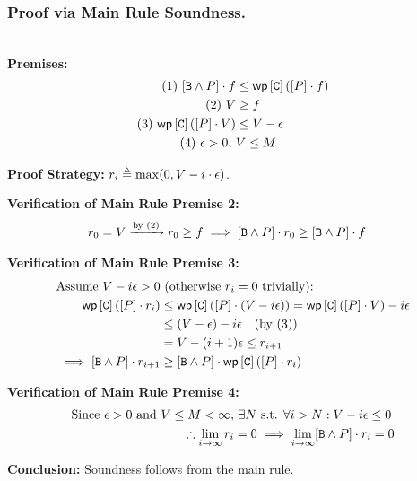 \subsubsection{Proof via Main Rule Soundness.}~\\
\noindent\textbf{Premises:}
\begin{align*}
  \text{(1) } [\mathtt{B} \wedge P] \cdot f &\le \mathsf{wp}\left[{\mathtt{C}}\right]\left({[P] \cdot f}\right) \\
  \text{(2) } V &\geq f \\
  \text{(3) } \mathsf{wp}\left[{\mathtt{C}}\right]\left({[P] \cdot V}\right) &\le V - \epsilon \\
  \text{(4) } \epsilon > 0, \ &V \leq M
\end{align*}

\noindent\textbf{Proof Strategy:} $r_i \triangleq \max(0, V - i \cdot \epsilon)$.

\noindent\textbf{Verification of Main Rule Premise 2:}
\begin{align*}
  r_0 = V \xrightarrow{\text{by (2)}} r_0 \ge f
    &\implies [\mathtt{B} \wedge P] \cdot r_0 \ge [\mathtt{B} \wedge P] \cdot f
\end{align*}

\noindent\textbf{Verification of Main Rule Premise 3:}
\begin{align*}
  \text{Assume } V - i\epsilon > 0 &\text{ (otherwise } r_i = 0 \text{ trivially):} \\
  \mathsf{wp}\left[{\mathtt{C}}\right]\left({[P] \cdot r_i}\right) &\le \mathsf{wp}\left[{\mathtt{C}}\right]\left({[P] \cdot (V - i\epsilon)}\right) = \mathsf{wp}\left[{\mathtt{C}}\right]\left({[P] \cdot V}\right) - i\epsilon \\
    &\le (V - \epsilon) - i\epsilon \quad \text{(by (3))} \\
    &= V - (i+1)\epsilon \le r_{i+1} \\
  \implies [\mathtt{B} \wedge P] \cdot r_{i+1} &\ge [\mathtt{B} \wedge P] \cdot \mathsf{wp}\left[{\mathtt{C}}\right]\left({[P] \cdot r_i}\right)
\end{align*}

\noindent\textbf{Verification of Main Rule Premise 4:}
\begin{align*}
  \text{Since } \epsilon > 0 \text{ and } V \leq M < \infty, &\ \exists N \text{ s.t. } \forall i > N: V - i\epsilon \le 0 \\
  \therefore \lim_{i \to \infty} r_i &= 0 \implies \lim_{i \to \infty} [\mathtt{B} \wedge P] \cdot r_i = 0
\end{align*}

\noindent\textbf{Conclusion:} Soundness follows from the main rule. \quad \checkmark
\\
